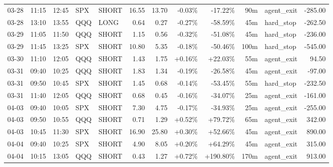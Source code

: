 \documentclass[11pt,a4paper,twoside]{article}
\begin{document}
\begin{center}
\begin{longtable}{>{\color{txtmain}}l l l l l r r r r r >{\color{txtmain}}l r}
03-28 & 11:15 & 12:45 & SPX & SHORT & 16.55 & 13.70 & \textcolor{lossred}{-0.03\%} & \textcolor{lossred}{-17.22\%} & 90m & agent\_exit & \textcolor{lossred}{-285.00} \\
03-28 & 13:10 & 13:55 & QQQ & LONG & 0.64 & 0.27 & \textcolor{lossred}{-0.27\%} & \textcolor{lossred}{-58.59\%} & 45m & hard\_stop & \textcolor{lossred}{-262.50} \\
03-29 & 11:05 & 11:50 & QQQ & SHORT & 1.15 & 0.56 & \textcolor{lossred}{-0.32\%} & \textcolor{lossred}{-51.08\%} & 45m & hard\_stop & \textcolor{lossred}{-236.00} \\
03-29 & 11:45 & 13:25 & SPX & SHORT & 10.80 & 5.35 & \textcolor{lossred}{-0.18\%} & \textcolor{lossred}{-50.46\%} & 100m & hard\_stop & \textcolor{lossred}{-545.00} \\
03-30 & 11:10 & 12:05 & QQQ & SHORT & 1.43 & 1.75 & \textcolor{wingreen}{+0.16\%} & \textcolor{wingreen}{+22.03\%} & 55m & agent\_exit & \textcolor{wingreen}{94.50} \\
03-31 & 09:40 & 10:25 & QQQ & SHORT & 1.83 & 1.34 & \textcolor{lossred}{-0.19\%} & \textcolor{lossred}{-26.58\%} & 45m & agent\_exit & \textcolor{lossred}{-97.00} \\
03-31 & 09:50 & 10:45 & SPX & SHORT & 1.45 & 0.68 & \textcolor{lossred}{-0.14\%} & \textcolor{lossred}{-53.45\%} & 55m & hard\_stop & \textcolor{lossred}{-232.50} \\
03-31 & 11:40 & 12:05 & QQQ & SHORT & 0.68 & 0.45 & \textcolor{lossred}{-0.16\%} & \textcolor{lossred}{-34.07\%} & 25m & agent\_exit & \textcolor{lossred}{-161.00} \\
04-03 & 09:40 & 10:05 & SPX & SHORT & 7.30 & 4.75 & \textcolor{lossred}{-0.17\%} & \textcolor{lossred}{-34.93\%} & 25m & agent\_exit & \textcolor{lossred}{-255.00} \\
04-03 & 09:50 & 10:55 & QQQ & SHORT & 0.71 & 1.29 & \textcolor{wingreen}{+0.52\%} & \textcolor{wingreen}{+79.72\%} & 65m & agent\_exit & \textcolor{wingreen}{342.00} \\
04-03 & 10:45 & 11:30 & SPX & SHORT & 16.90 & 25.80 & \textcolor{wingreen}{+0.30\%} & \textcolor{wingreen}{+52.66\%} & 45m & agent\_exit & \textcolor{wingreen}{890.00} \\
04-04 & 09:40 & 10:25 & SPX & SHORT & 4.90 & 8.05 & \textcolor{wingreen}{+0.20\%} & \textcolor{wingreen}{+64.29\%} & 45m & agent\_exit & \textcolor{wingreen}{315.00} \\
04-04 & 10:15 & 13:05 & QQQ & SHORT & 0.43 & 1.27 & \textcolor{wingreen}{+0.72\%} & \textcolor{wingreen}{+190.80\%} & 170m & agent\_exit & \textcolor{wingreen}{913.00} \\

\end{longtable}
\end{center}
\end{document}
